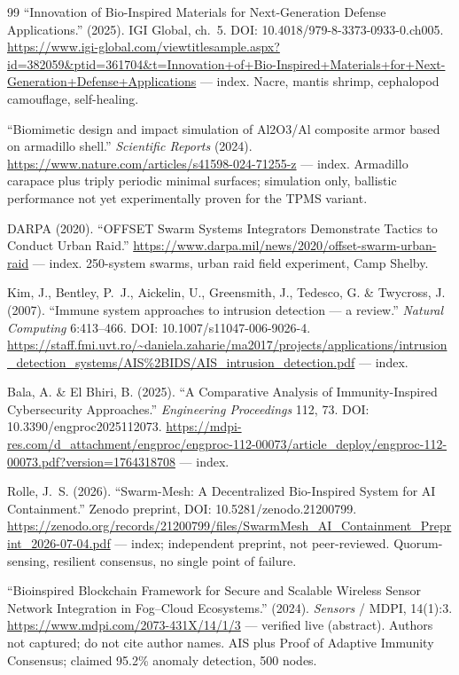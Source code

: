 \documentclass[11pt]{article}
\begin{document}
\begin{thebibliography}{99}
 ``Innovation of Bio-Inspired Materials for
Next-Generation Defense Applications.'' (2025). IGI Global, ch.~5. DOI:
10.4018/979-8-3373-0933-0.ch005.
\url{https://www.igi-global.com/viewtitlesample.aspx?id=382059&ptid=361704&t=Innovation+of+Bio-Inspired+Materials+for+Next-Generation+Defense+Applications}
--- index. Nacre, mantis shrimp, cephalopod camouflage, self-healing.

 ``Biomimetic design and impact simulation of
Al2O3/Al composite armor based on armadillo shell.'' \emph{Scientific
Reports} (2024).
\url{https://www.nature.com/articles/s41598-024-71255-z} --- index.
Armadillo carapace plus triply periodic minimal surfaces; simulation
only, ballistic performance not yet experimentally proven for the TPMS
variant.

 DARPA (2020). ``OFFSET Swarm Systems Integrators
Demonstrate Tactics to Conduct Urban Raid.''
\url{https://www.darpa.mil/news/2020/offset-swarm-urban-raid} --- index.
250-system swarms, urban raid field experiment, Camp Shelby.

 Kim, J., Bentley, P.~J., Aickelin, U., Greensmith,
J., Tedesco, G. \& Twycross, J. (2007). ``Immune system approaches to
intrusion detection --- a review.'' \emph{Natural Computing} 6:413--466.
DOI: 10.1007/s11047-006-9026-4.
\url{https://staff.fmi.uvt.ro/~daniela.zaharie/ma2017/projects/applications/intrusion_detection_systems/AIS%2BIDS/AIS_intrusion_detection.pdf}
--- index.

 Bala, A. \& El Bhiri, B. (2025). ``A Comparative
Analysis of Immunity-Inspired Cybersecurity Approaches.''
\emph{Engineering Proceedings} 112, 73. DOI:
10.3390/engproc2025112073.
\url{https://mdpi-res.com/d_attachment/engproc/engproc-112-00073/article_deploy/engproc-112-00073.pdf?version=1764318708}
--- index.

 Rolle, J.~S. (2026). ``Swarm-Mesh: A
Decentralized Bio-Inspired System for AI Containment.'' Zenodo preprint,
DOI: 10.5281/zenodo.21200799.
\url{https://zenodo.org/records/21200799/files/SwarmMesh_AI_Containment_Preprint_2026-07-04.pdf}
--- index; independent preprint, not peer-reviewed. Quorum-sensing,
resilient consensus, no single point of failure.

 ``Bioinspired Blockchain Framework for
Secure and Scalable Wireless Sensor Network Integration in Fog--Cloud
Ecosystems.'' (2024). \emph{Sensors} / MDPI, 14(1):3.
\url{https://www.mdpi.com/2073-431X/14/1/3} --- verified live
(abstract). Authors not captured; do not cite author names. AIS plus
Proof of Adaptive Immunity Consensus; claimed 95.2\% anomaly detection,
500 nodes.


\end{thebibliography}
\end{document}
